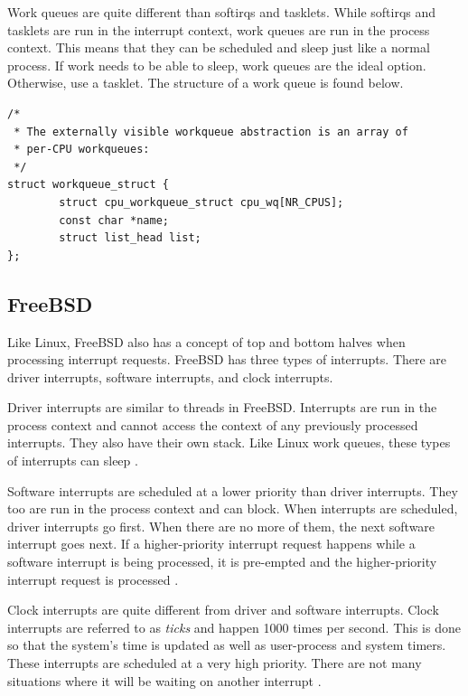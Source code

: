 \documentclass[10pt,draftclsnofoot,onecolumn,journal,compsoc]{IEEEtran}
\begin{document}
Work queues are quite different than softirqs and tasklets. While softirqs and tasklets are run in the interrupt context, work queues are run in the process context. This means that they can be scheduled and sleep just like a normal process. If work needs to be able to sleep, work queues are the ideal option. Otherwise, use a tasklet. The structure of a work queue is found below.

\begin{lstlisting}[caption={The \textit{workqueue\_struct} structure in the linux/workqueue.h file.}]
/*
 * The externally visible workqueue abstraction is an array of
 * per-CPU workqueues:
 */
struct workqueue_struct {
        struct cpu_workqueue_struct cpu_wq[NR_CPUS];
        const char *name;
        struct list_head list;
};
\end{lstlisting}

\subsection{FreeBSD}
Like Linux, FreeBSD also has a concept of top and bottom halves when processing interrupt requests. FreeBSD has three types of interrupts. There are driver interrupts, software interrupts, and clock interrupts. 

Driver interrupts are similar to threads in FreeBSD. Interrupts are run in the process context and cannot access the context of any previously processed interrupts. They also have their own stack. Like Linux work queues, these types of interrupts can sleep \cite{bsd_proc}. 

Software interrupts are scheduled at a lower priority than driver interrupts. They too are run in the process context and can block. When interrupts are scheduled, driver interrupts go first. When there are no more of them, the next software interrupt goes next. If a higher-priority interrupt request happens while a software interrupt is being processed, it is pre-empted and the higher-priority interrupt request is processed \cite{bsd_proc}.

Clock interrupts are quite different from driver and software interrupts. Clock interrupts are referred to as \textit{ticks} and happen 1000 times per second. This is done so that the system's time is updated as well as user-process and system timers. These interrupts are scheduled at a very high priority. There are not many situations where it will be waiting on another interrupt \cite{bsd_proc}.  
\end{document}
